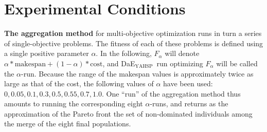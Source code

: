 \documentclass{llncs}
\newcommand{\DAEYAHSP}{{\sc DaE$_{\text{YAHSP}}$}}
\renewcommand{\paragraph}[1]{{\bf #1}}
\begin{document}
% 

\section{Experimental Conditions}
\label{sec:condition}


\paragraph{The aggregation method} for multi-objective optimization runs in turn a series of single-objective problems. The fitness of each of these problems is defined using a single positive parameter $\alpha$. In the following, $F_{\alpha}$ will denote $\alpha * \mbox{makespan} + (1-\alpha) * \mbox{cost}$, and \DAEYAHSP\ run optimizing $F_{\alpha}$ will be called the $\alpha$-run. Because the range of the makespan values is approximately twice as large as that of the cost, the following values of $\alpha$ have been used: ${0, 0.05, 0.1, 0.3, 0.5, 0.55, 0.7, 1.0}$. One ``run'' of the aggregation method thus amounts to running the corresponding eight $\alpha$-runs, and returns as the approximation of the Pareto front the set of non-dominated individuals among the merge of the eight final populations.
\end{document}
